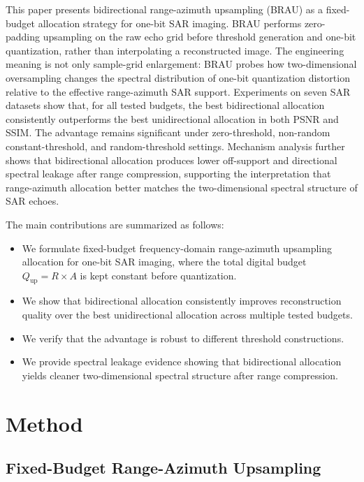 \documentclass[conference]{IEEEtran}
\begin{document}
This paper presents bidirectional range-azimuth upsampling (BRAU) as a fixed-budget allocation strategy for one-bit SAR imaging. BRAU performs zero-padding upsampling on the raw echo grid before threshold generation and one-bit quantization, rather than interpolating a reconstructed image. The engineering meaning is not only sample-grid enlargement: BRAU probes how two-dimensional oversampling changes the spectral distribution of one-bit quantization distortion relative to the effective range-azimuth SAR support. Experiments on seven SAR datasets show that, for all tested budgets, the best bidirectional allocation consistently outperforms the best unidirectional allocation in both PSNR and SSIM. The advantage remains significant under zero-threshold, non-random constant-threshold, and random-threshold settings. Mechanism analysis further shows that bidirectional allocation produces lower off-support and directional spectral leakage after range compression, supporting the interpretation that range-azimuth allocation better matches the two-dimensional spectral structure of SAR echoes.

The main contributions are summarized as follows:
\begin{itemize}
    \item We formulate fixed-budget frequency-domain range-azimuth upsampling allocation for one-bit SAR imaging, where the total digital budget $Q_{\mathrm{up}}=R\times A$ is kept constant before quantization.
    \item We show that bidirectional allocation consistently improves reconstruction quality over the best unidirectional allocation across multiple tested budgets.
    \item We verify that the advantage is robust to different threshold constructions.
    \item We provide spectral leakage evidence showing that bidirectional allocation yields cleaner two-dimensional spectral structure after range compression.
\end{itemize}

\section{Method}

\subsection{Fixed-Budget Range-Azimuth Upsampling}
\end{document}
